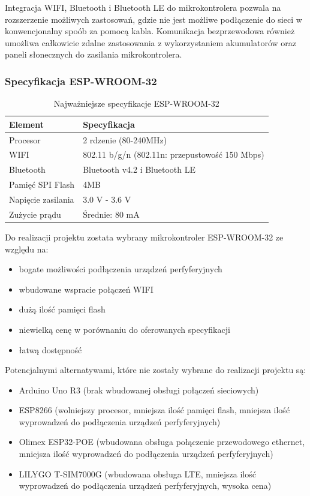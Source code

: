 \documentclass[12pt,a4paper]{article}
\begin{document}
Integracja WIFI, Bluetooth i Bluetooth LE do mikrokontrolera pozwala na rozszerzenie możliwych zastosowań, gdzie nie jest możliwe podłączenie do sieci
w konwencjonalny spoób za pomocą kabla. Komunikacja bezprzewodowa również umożliwa całkowicie zdalne zastosowania z wykorzystaniem akumulatorów
oraz paneli słonecznych do zasilania mikrokontrolera.

\subsubsection{Specyfikacja ESP-WROOM-32}

\begin{table}[H]
    \centering
    \begin{tabular}{|l|l|}
        \hline
        Element & Specyfikacja \\
        \hline
        Procesor & 2 rdzenie (80-240MHz) \\
        \hline
        WIFI & 802.11 b/g/n (802.11n: przepustowość 150 Mbps) \\
        \hline
        Bluetooth & Bluetooth v4.2 i Bluetooth LE \\
        \hline
        Pamięć SPI Flash & 4MB \\
        \hline
        Napięcie zasilania & 3.0 V - 3.6 V \\
        \hline
        Zużycie prądu & Średnie: 80 mA \\
        \hline
    \end{tabular}
    \caption{Najważniejsze specyfikacje ESP-WROOM-32}
    \label{esp32-spec}
\end{table}

Do realizacji projektu zostata wybrany mikrokontroler ESP-WROOM-32 ze względu na:
\begin{itemize}
    \item bogate możliwości podłączenia urządzeń perfyferyjnych
    \item wbudowane wspracie połączeń WIFI
    \item dużą ilość pamięci flash
    \item niewielką cenę w porównaniu do oferowanych specyfikacji
    \item łatwą dostępność
\end{itemize}

\noindent Potencjalnymi alternatywami, które nie zostały wybrane do realizacji projektu są:
\begin{itemize}
    \item Arduino Uno R3 (brak wbudowanej obsługi połączeń sieciowych)
    \item ESP8266 (wolniejszy procesor, mniejsza ilość pamięci flash, mniejsza ilość wyprowadzeń do podłączenia urządzeń perfyferyjnych)
    \item Olimex ESP32-POE\cite{olimex-esp32poe} (wbudowana obsługa połączenie przewodowego ethernet, mniejsza ilość wyprowadzeń do podłączenia urządzeń perfyferyjnych)
    \item LILYGO T-SIM7000G\cite{lilygo-esp32lte} (wbudowana obsługa LTE, mniejsza ilość wyprowadzeń do podłączenia urządzeń perfyferyjnych, wysoka cena)
\end{itemize}
\end{document}
